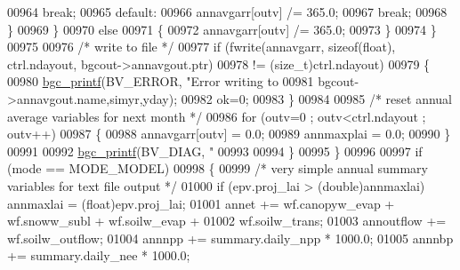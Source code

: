 \begin{DoxyCode}
{{{{{{{{{{{{{{{{{{{{{{{{{{{{{{{{{{{{{{{{{{{00964                                     \textcolor{keywordflow}{break};
00965                                 \textcolor{keywordflow}{default}: 
00966                                     annavgarr[outv] /= 365.0;
00967                                     \textcolor{keywordflow}{break};
00968                             \}
00969                         \}
00970                         \textcolor{keywordflow}{else}
00971                         \{
00972                             annavgarr[outv] /= 365.0;
00973                         \}
00974                     \}
00975                     
00976                     \textcolor{comment}{/* write to file */}
00977                     \textcolor{keywordflow}{if} (fwrite(annavgarr, \textcolor{keyword}{sizeof}(\textcolor{keywordtype}{float}), ctrl.ndayout, bgcout->annavgout.ptr)
00978                         != (size\_t)ctrl.ndayout)
00979                     \{
00980                         \hyperlink{bgc__io_8c_af287cce6e2aede1ce337de9319e80d0d}{bgc\_printf}(BV\_ERROR, \textcolor{stringliteral}{"Error writing to %
00981                             bgcout->annavgout.name,simyr,yday);
00982                         ok=0;
00983                     \}
00984                     
00985                     \textcolor{comment}{/* reset annual average variables for next month */}
00986                     \textcolor{keywordflow}{for} (outv=0 ; outv<ctrl.ndayout ; outv++)
00987                     \{
00988                         annavgarr[outv] = 0.0;
00989                         annmaxplai = 0.0;
00990                     \}
00991                     
00992                     \hyperlink{bgc__io_8c_af287cce6e2aede1ce337de9319e80d0d}{bgc\_printf}(BV\_DIAG, \textcolor{stringliteral}{"%
00993                 
00994                 \}
00995             \}
00996             
00997             \textcolor{keywordflow}{if} (mode == MODE\_MODEL)
00998             \{
00999                 \textcolor{comment}{/* very simple annual summary variables for text file output */}
01000                 \textcolor{keywordflow}{if} (epv.proj\_lai > (\textcolor{keywordtype}{double})annmaxlai) annmaxlai = (float)epv.proj\_lai;
01001                 annet += wf.canopyw\_evap + wf.snoww\_subl + wf.soilw\_evap +
01002                     wf.soilw\_trans;
01003                 annoutflow += wf.soilw\_outflow;
01004                 annnpp += summary.daily\_npp * 1000.0;
01005                 annnbp += summary.daily\_nee * 1000.0;
}}}}}}}}}}}}}}}}}}}}}}}}}}}}}}}}}}}}}}}}}}}}}
\end{DoxyCode}
